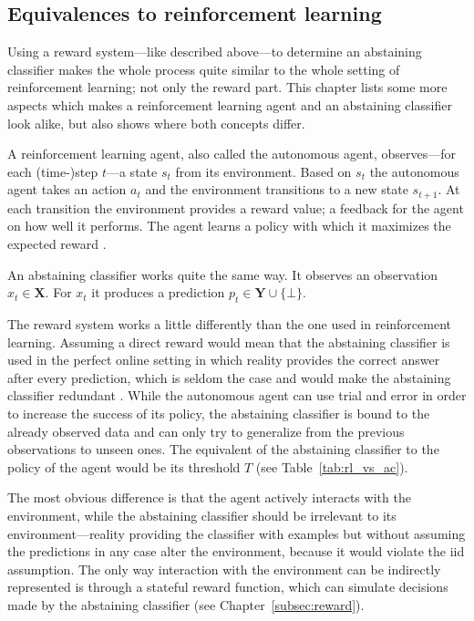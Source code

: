 \documentclass[twoside,11pt]{article}
\def\X{\textbf{X}}
\def\Y{\textbf{Y}}
\begin{document}

\subsection{Equivalences to reinforcement learning}
\label{subsec:rl_vs_ac}

Using a reward system---like described above---to determine
an abstaining classifier makes the whole process quite
similar to the whole setting of reinforcement learning; not
only the reward part. This chapter lists some more aspects
which makes a reinforcement learning agent and an
abstaining classifier look alike, but also shows where
both concepts differ.

A reinforcement learning agent, also called the autonomous
agent, observes---for each (time-)step $t$---a state $s_t$
from its environment.
Based on $s_t$ the autonomous agent takes an action $a_t$
and the environment transitions to a new state $s_{t+1}$.
At each transition the environment provides a reward
value; a feedback for the agent on how well it performs.
The agent learns a policy with which it maximizes the
expected reward \citep[see][]{arulkumaran_et_al_2017}.

An abstaining classifier works quite the same way.
It observes an observation $x_t \in \X$.
For $x_t$ it produces a prediction $p_t \in \Y \cup
\{\bot\}$.

The reward system works a little differently than the one
used in reinforcement learning. Assuming a direct reward
would mean that the abstaining classifier is used in the
perfect online setting in which reality provides the
correct answer after every prediction, which is seldom the
case and would make the abstaining classifier redundant
\citep[see][Chapter 4.3]{alrw}.
While the autonomous agent can use trial and error in order
to increase the success of its policy, the abstaining
classifier is bound to the already observed data and can
only try to generalize from the previous observations to
unseen ones.
The equivalent of the abstaining classifier to the policy
of the agent would be its threshold $T$ (see
Table~\ref{tab:rl_vs_ac}).

The most obvious difference is that the agent actively
interacts with the environment, while the abstaining
classifier should be irrelevant to its
environment---reality providing the classifier with
examples but without assuming the predictions in any case
alter the environment, because it would violate the iid
assumption. The only way interaction with the
environment can be indirectly represented is through a
stateful reward function, which can simulate decisions made
by the abstaining classifier
(see Chapter~\ref{subsec:reward}).
\end{document}
